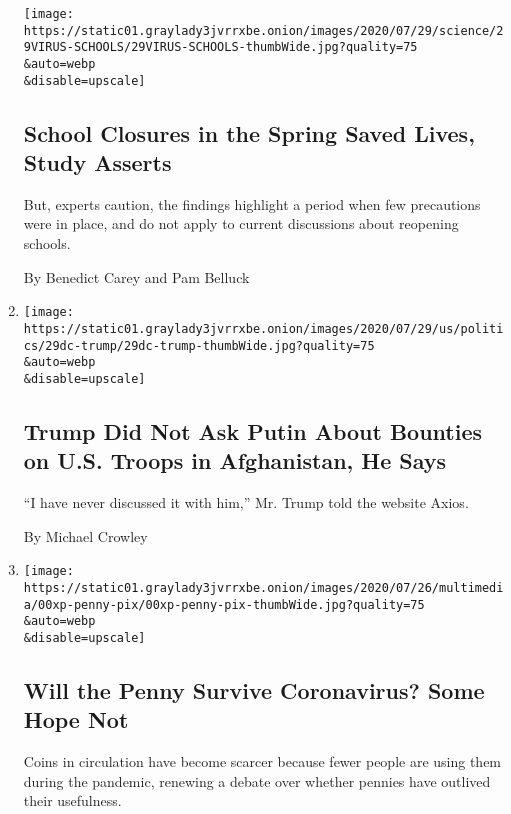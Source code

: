 \begin{enumerate}
  \texttt{[image: https://static01.graylady3jvrrxbe.onion/images/2020/07/29/science/29VIRUS-SCHOOLS/29VIRUS-SCHOOLS-thumbWide.jpg?quality=75\\\&auto=webp\\\&disable=upscale]}

  \hypertarget{school-closures-in-the-spring-saved-lives-study-asserts}{%
  \subsection{School Closures in the Spring Saved Lives, Study
  Asserts}\label{school-closures-in-the-spring-saved-lives-study-asserts}}

  But, experts caution, the findings highlight a period when few
  precautions were in place, and do not apply to current discussions
  about reopening schools.

  By Benedict Carey and Pam Belluck
\item
  \href{/2020/07/29/us/politics/trump-putin-bounties.html}{}

  \texttt{[image: https://static01.graylady3jvrrxbe.onion/images/2020/07/29/us/politics/29dc-trump/29dc-trump-thumbWide.jpg?quality=75\\\&auto=webp\\\&disable=upscale]}

  \hypertarget{trump-did-not-ask-putin-about-bounties-on-us-troops-in-afghanistan-he-says}{%
  \subsection{Trump Did Not Ask Putin About Bounties on U.S. Troops in
  Afghanistan, He
  Says}\label{trump-did-not-ask-putin-about-bounties-on-us-troops-in-afghanistan-he-says}}

  ``I have never discussed it with him,'' Mr. Trump told the website
  Axios.

  By Michael Crowley
\item
  \href{/2020/07/29/business/coin-shortage-penny.html}{}

  \texttt{[image: https://static01.graylady3jvrrxbe.onion/images/2020/07/26/multimedia/00xp-penny-pix/00xp-penny-pix-thumbWide.jpg?quality=75\\\&auto=webp\\\&disable=upscale]}

  \hypertarget{will-the-penny-survive-coronavirus-some-hope-not}{%
  \subsection{Will the Penny Survive Coronavirus? Some Hope
  Not}\label{will-the-penny-survive-coronavirus-some-hope-not}}

  Coins in circulation have become scarcer because fewer people are
  using them during the pandemic, renewing a debate over whether pennies
  have outlived their usefulness.


\end{enumerate}
